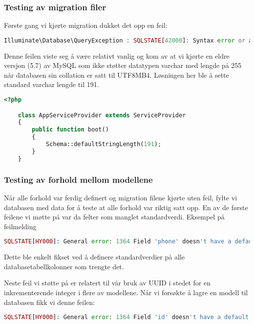 \subsubsection{Testing av migration filer}
Første gang vi kjørte migration dukket det opp en feil:
\begin{lstlisting}[caption={Feilmelding i Laravel ved kjøring av migration} language=PHP]
Illuminate\Database\QueryException : SQLSTATE[42000]: Syntax error or access violation: 1071 Specified key was too long; max key length is 767 bytes (SQL: alter table `users` add unique `users_email_unique`(`email`))
\end{lstlisting}
Denne feilen viste seg å være relativt vanlig og kom av at vi kjørte en eldre versjon (5.7) av MySQL som ikke støtter datatypen varchar med lengde på 255 når databasen sin collation er satt til UTF8MB4. Løsningen her ble å sette standard varchar lengde til 191.
\begin{lstlisting}[caption={Definering av standard varchar lengde i AppServiceProvider.php} language=PHP]
    <?php

    class AppServiceProvider extends ServiceProvider
    {
        public function boot()
        {
            Schema::defaultStringLength(191);
        }
    }
\end{lstlisting}

\subsubsection{Testing av forhold mellom modellene}
Når alle forhold var ferdig definert og migration filene kjørte uten feil, fylte vi databasen med data for å teste at alle forhold var riktig satt opp.
En av de første feilene vi møtte på var da felter som manglet standardverdi.
Eksempel på feilmelding
\begin{lstlisting}[language=PHP]
    SQLSTATE[HY000]: General error: 1364 Field 'phone' doesn't have a default value (SQL: insert into `users` (`name`, `email`, `phone`, ...
\end{lstlisting}
Dette ble enkelt fikset ved å definere standardverdier på alle databasetabellkolonner som trengte det.

Neste feil vi støtte på er relatert til vår bruk av UUID i stedet for en inkrementerende integer i flere av modellene. Når vi forsøkte å lagre en modell til databasen fikk vi denne feilen:
\begin{lstlisting}[language=PHP]
    SQLSTATE[HY000]: General error: 1364 Field 'id' doesn't have a default value (SQL: insert into `users` (`name`, `email`, `phone`, ...
\end{lstlisting}

